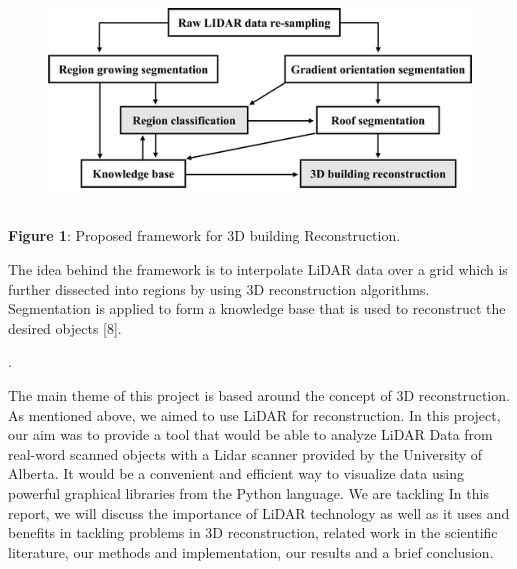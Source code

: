 \documentclass[12pt]{report}
\begin{document}
\begin{figure}[H]
	\begin{Center}
		\includegraphics[width=5.42in,height=2.29in]{./media/image6.png}
	\end{Center}
\end{figure}



\par


\vspace{\baselineskip}
\begin{Center}
\textbf{Figure 1}: Proposed framework for 3D building Reconstruction.
\end{Center}\par


\vspace{\baselineskip}
The idea behind the framework is to interpolate LiDAR data over a grid which is further dissected into regions by using 3D reconstruction algorithms. Segmentation is applied to form a knowledge base that is used to reconstruct the desired objects [8].\par

.\par

The main theme of this project is based around the concept of 3D reconstruction. As mentioned above, we aimed to use LiDAR for reconstruction. In this project, our aim was to provide a tool that would be able to analyze LiDAR Data from real-word scanned objects with a Lidar scanner provided by the University of Alberta. It would be a convenient and efficient way to visualize data using powerful graphical libraries from the Python language. We are tackling In this report, we will discuss the importance of LiDAR technology as well as it uses and benefits in tackling problems in 3D reconstruction, related work in the scientific literature, our methods and implementation, our results and a brief conclusion.\par
\end{document}

